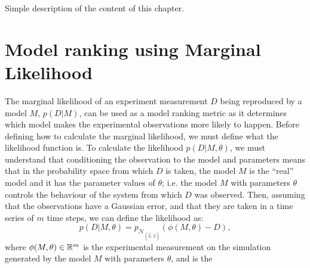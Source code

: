 {\color{blue} Simple description of the content of this chapter}.

\section{Model ranking using Marginal Likelihood}
The marginal likelihood of an experiment measurement $D$ being 
reproduced by a model $M$, $p (D | M)$, can be used as a model ranking 
metric as it determines which model makes the experimental observations 
more likely to happen. Before defining how to calculate the marginal 
likelihood, we must define what the likelihood function is. To calculate 
the likelihood $p (D | M, \theta)$, we must understand that conditioning 
the observation to the model and parameters means that in 
the probability space from which $D$ is taken, the model $M$ is the 
``real'' model and it has the parameter values of $\theta$; i.e. the 
model $M$ with parameters $\theta$ controls the behaviour of the system 
from which $D$ was observed. Then, assuming that the observations have a 
Gaussian error, and that they are taken in a time series of $m$ time 
steps, we can define the likelihood as:
\begin{equation}
    p (D | M, \theta) = p_{\mathcal{N}_{\left(\vec{0}, \Sigma\right)}}
        (\phi (M,\theta) - D),
\label{eq:likelihood_multivariate}
\end{equation}
where $\phi (M, \theta) \in \mathbb{R}^m$ is the experimental measurement 
on the simulation generated by the model $M$ with parameters $\theta$,
and  is the 
